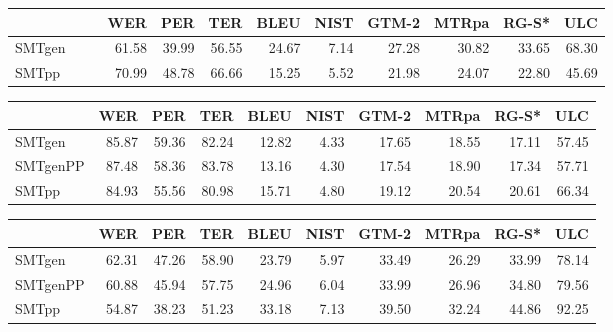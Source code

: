 \documentclass[a4paper,11pt]{article}
\begin{document}
\begin{table}[t]
\small

\begin{tabular}{lrrrrrrrrr}
\toprule
         & WER   &  PER  & TER   &  BLEU & NIST & GTM-2 & MTRpa & RG-S* & ULC \\
\midrule
SMTgen~~~~ & 61.58 & 39.99 & 56.55 & 24.67 & 7.14 & 27.28 & 30.82 & 33.65 & 68.30 \\  
SMTpp	 & 70.99 & 48.78 & 66.66 & 15.25 & 5.52 & 21.98 & 24.07 & 22.80 & 45.69 \\  
\bottomrule
\end{tabular}

\begin{tabular}{lrrrrrrrrr}
\toprule
         & WER   &  PER  & TER   &  BLEU & NIST & GTM-2 & MTRpa & RG-S* & ULC \\
\midrule

SMTgen	 & 85.87 & 59.36 & 82.24 & 12.82 & 4.33 & 17.65 & 18.55 & 17.11 & 57.45 \\  
SMTgenPP & 87.48 & 58.36 & 83.78 & 13.16 & 4.30 & 17.54 & 18.90 & 17.34 & 57.71 \\  
SMTpp	 & 84.93 & 55.56 & 80.98 & 15.71 & 4.80 & 19.12 & 20.54 & 20.61 & 66.34 \\  
\bottomrule
\end{tabular}

\begin{tabular}{lrrrrrrrrr}
\toprule
         & WER   &  PER  & TER   &  BLEU & NIST & GTM-2 & MTRpa & RG-S* & ULC \\
\midrule
SMTgen   & 62.31 & 47.26 & 58.90 & 23.79 & 5.97 & 33.49 & 26.29 & 33.99 & 78.14 \\  
SMTgenPP & 60.88 & 45.94 & 57.75 & 24.96 & 6.04 & 33.99 & 26.96 & 34.80 & 79.56 \\  
SMTpp	 & 54.87 & 38.23 & 51.23 & 33.18 & 7.13 & 39.50 & 32.24 & 44.86 & 92.25 \\  
\bottomrule
\end{tabular}


\end{table}
\end{document}
